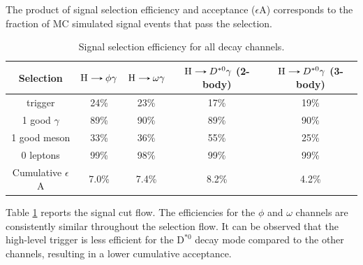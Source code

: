 The product of signal selection efficiency and acceptance ($\epsilon$A) corresponds to the fraction of MC simulated signal events that pass the selection.
\begin{table}[!ht]
    \centering
    \begin{tabular}{|c|c|c|c|c|}
        \hline
        \cellcolor{lightgray}Selection &\cellcolor{lightgray}$\text{H}\decaysto \phi\gamma$ &\cellcolor{lightgray}$\text{H}\decaysto \omega\gamma$ &\cellcolor{lightgray}$\text{H}\decaysto D^{*0}\gamma$ {\scriptsize(2-body)}&\cellcolor{lightgray}$\text{H}\decaysto D^{*0}\gamma$ {\scriptsize(3-body)}\\ \hline
        trigger                                     & 24\%  & 23\%  & 17\%  & 19\% \\
        1 good $\gamma$                             & 89\%  & 90\%  & 89\%  & 90\% \\
        1 good meson                                & 33\%  & 36\%  & 55\%  & 25\% \\
        0 leptons                                   & 99\%  & 98\%  & 99\%  & 99\% \\ \hline
        Cumulative $\epsilon$A                      & 7.0\%  & 7.4\%  & 8.2\%  & 4.2\% \\
        \hline
        \end{tabular}
    \caption{Signal selection efficiency for all decay channels.}
    \label{tab:selection_efficiency}
\end{table}
Table \ref{tab:selection_efficiency} reports the signal cut flow. The efficiencies for the $\phi$ and $\omega$ channels are consistently similar throughout the selection flow. It can be observed that the high-level trigger is less efficient for the $\text{D}^{*0}$ decay mode compared to the other channels, resulting in a lower cumulative acceptance.


